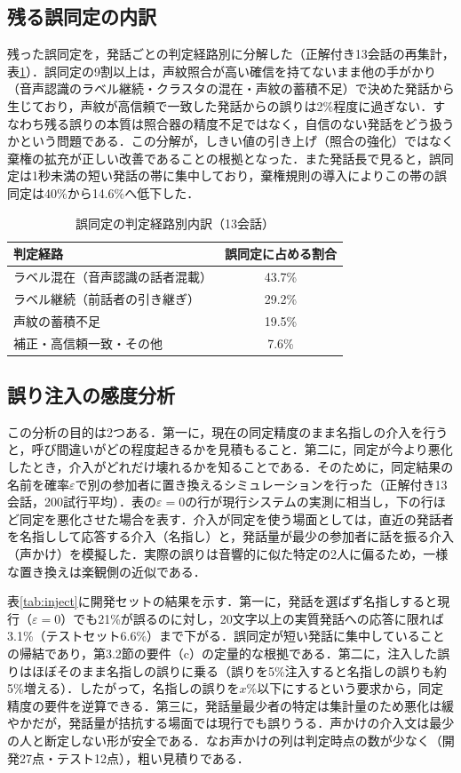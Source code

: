 \documentclass[a4paper]{ltjsarticle}
\begin{document}
\subsection{残る誤同定の内訳}
残った誤同定を，発話ごとの判定経路別に分解した（正解付き13会話の再集計，表\ref{tab:kind}）．誤同定の9割以上は，声紋照合が高い確信を持てないまま他の手がかり（音声認識のラベル継続・クラスタの混在・声紋の蓄積不足）で決めた発話から生じており，声紋が高信頼で一致した発話からの誤りは2\%程度に過ぎない．すなわち残る誤りの本質は照合器の精度不足ではなく，自信のない発話をどう扱うかという問題である．この分解が，しきい値の引き上げ（照合の強化）ではなく棄権の拡充が正しい改善であることの根拠となった．また発話長で見ると，誤同定は1秒未満の短い発話の帯に集中しており，棄権規則の導入によりこの帯の誤同定は40\%から14.6\%へ低下した．

\begin{table}[tb]
\centering
\caption{誤同定の判定経路別内訳（13会話）}
\label{tab:kind}
\small
\begin{tabular}{lc}
\toprule
判定経路 & 誤同定に占める割合 \\
\midrule
ラベル混在（音声認識の話者混載） & 43.7\% \\
ラベル継続（前話者の引き継ぎ） & 29.2\% \\
声紋の蓄積不足 & 19.5\% \\
補正・高信頼一致・その他 & 7.6\% \\
\bottomrule
\end{tabular}
\end{table}

\subsection{誤り注入の感度分析}
この分析の目的は2つある．第一に，現在の同定精度のまま名指しの介入を行うと，呼び間違いがどの程度起きるかを見積もること．第二に，同定が今より悪化したとき，介入がどれだけ壊れるかを知ることである．そのために，同定結果の名前を確率$\varepsilon$で別の参加者に置き換えるシミュレーションを行った（正解付き13会話，200試行平均）．表の$\varepsilon=0$の行が現行システムの実測に相当し，下の行ほど同定を悪化させた場合を表す．介入が同定を使う場面としては，直近の発話者を名指しして応答する介入（名指し）と，発話量が最少の参加者に話を振る介入（声かけ）を模擬した．実際の誤りは音響的に似た特定の2人に偏るため，一様な置き換えは楽観側の近似である．

表\ref{tab:inject}に開発セットの結果を示す．第一に，発話を選ばず名指しすると現行（$\varepsilon=0$）でも21\%が誤るのに対し，20文字以上の実質発話への応答に限れば3.1\%（テストセット6.6\%）まで下がる．誤同定が短い発話に集中していることの帰結であり，第3.2節の要件（c）の定量的な根拠である．第二に，注入した誤りはほぼそのまま名指しの誤りに乗る（誤りを5\%注入すると名指しの誤りも約5\%増える）．したがって，名指しの誤りを$x$\%以下にするという要求から，同定精度の要件を逆算できる．第三に，発話量最少者の特定は集計量のため悪化は緩やかだが，発話量が拮抗する場面では現行でも誤りうる．声かけの介入文は最少の人と断定しない形が安全である．なお声かけの列は判定時点の数が少なく（開発27点・テスト12点），粗い見積りである．
\end{document}
